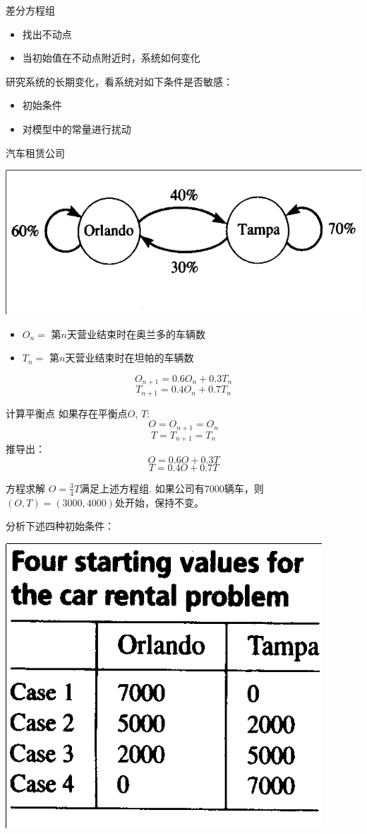 \documentclass{beamer}
\begin{document}
\begin{frame}{差分方程组}
  \begin{itemize}
  \item 找出不动点
  \item 当初始值在不动点附近时，系统如何变化
  \end{itemize}

研究系统的长期变化，看系统对如下条件是否敏感：
\begin{itemize}
\item 初始条件
\item 对模型中的常量进行扰动
\end{itemize}

\end{frame}

\begin{frame}{汽车租赁公司}
  \begin{center}
    \includegraphics[width=.35\textwidth{}]{taxi.png}
  \end{center}
  \begin{definition}
    \begin{itemize}
    \item $O_n =$ 第$n$天营业结束时在奥兰多的车辆数
    \item $T_n =$ 第$n$天营业结束时在坦帕的车辆数
    \end{itemize}
  \end{definition}
  \[
  O_{n+1}=0.6O_n + 0.3T_n
  \]
  \[
  T_{n+1}=0.4O_n + 0.7T_n
  \]
\end{frame}

\begin{frame}{计算平衡点}
  如果存在平衡点$O$, $T$:
  \[
  O=O_{n+1}=O_n
  \]
  \[
  T=T_{n+1}=T_n
  \]
  推导出：
  \[
  O=0.6O + 0.3T
  \]
  \[
  T=0.4O + 0.7T
  \]
\end{frame}

\begin{frame}{方程求解}
  $O=\frac{3}{4}T$满足上述方程组. 如果公司有7000辆车，则$(O, T) = (3000, 4000)$处开始，保持不变。

  分析下述四种初始条件：

  \begin{center}
    \includegraphics[width=.4\textwidth{}]{taxi-cases.png}
  \end{center}

\end{frame}
\end{document}
